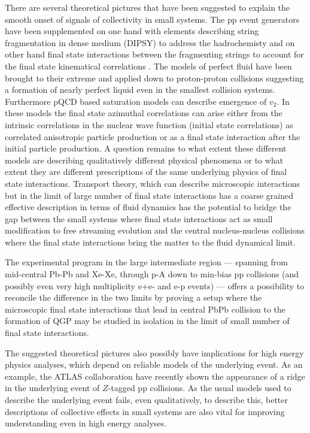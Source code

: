 \documentclass[../report.tex]{subfiles}
\begin{document}
There are several theoretical pictures that have been suggested to explain the smooth onset of signals of collectivity in small systems. The pp event generators have been supplemented on one hand with elements describing string fragmentation in dense medium (DIPSY) to address the hadrochemisty and on other hand final state interactions between the fragmenting strings to account for the final state kinematical correlations \cite{Bierlich:2017vhg}. 
The models of perfect fluid have been brought to their extreme and applied down to proton-proton collisions \cite{Weller:2017tsr,Aidala:2018mcw} suggesting a formation of nearly perfect liquid even in the smallest collision systems. Furthermore pQCD based saturation models can describe emergence of $v_2$. In these models the final state azimuthal correlations can arise either from the intrinsic correlations in the nuclear wave function (initial state correlations) as correlated anisotropic particle production or as a final state interaction after the initial particle production. 
A question remains to what extent these different models are describing qualitatively different physical phenomena or to what extent they are different prescriptions of the same underlying physics of final state interactions. Transport theory, which can describe microscopic interactions but in the limit of large number of final state interactions has a coarse grained effective description in terms of fluid dynamics has the potential to bridge the gap between the small systems where final state interactions act as small modification to free streaming evolution and the central nucleus-nucleus collisions where the final state interactions bring the matter to the fluid dynamical limit. 

The experimental program in the large intermediate region --- spanning from mid-central Pb-Pb and Xe-Xe, through p-A down to min-bias pp collisions (and possibly even very high multiplicity e+e- and e-p events) --- offers a possibility to reconcile the difference in the two limits by proving a setup where the microscopic final state interactions that lead in central PbPb collision to the formation of QGP may be studied in isolation in the limit of small number of final state interactions.  

The suggested theoretical pictures also possibly have implications for high energy physics analyses, which depend on reliable models of the underlying event. As an example, the ATLAS collaboration have recently shown the appearance of a ridge in the underlying event of $Z$-tagged pp collisions. As the usual models used to describe the underlying event fails, even qualitatively, to describe this, better descriptions of collective effects in small systems are also vital for improving understanding even in high energy analyses.
\end{document}
